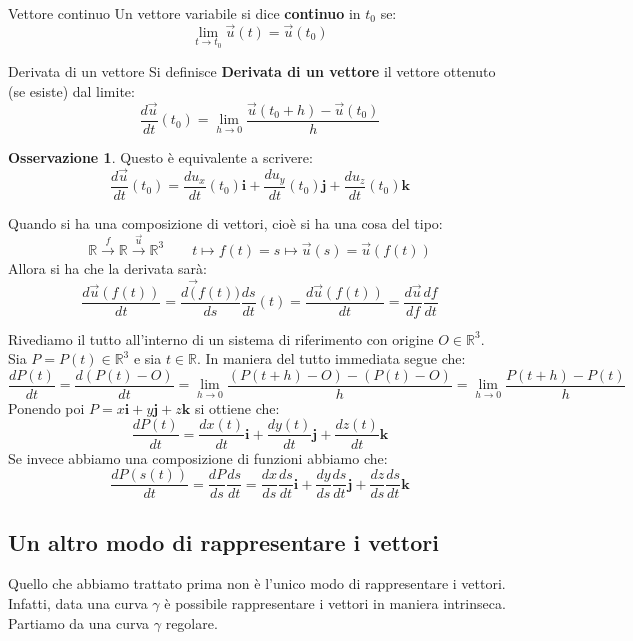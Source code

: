 \documentclass[11pt,a4paper,twoside]{article}
\theoremstyle{definition}
\newtheorem*{oss}{Osservazione}
\begin{document}
\begin{defn}{Vettore continuo}{}
	Un vettore variabile si dice \textbf{continuo} in $t_0$ se:
	\[
		\lim_{t \to t_0} \vec u(t) = \vec u(t_0)
	\]
\end{defn}

\begin{defn}{Derivata di un vettore}{}
	Si definisce \textbf{Derivata di un vettore} il vettore ottenuto (se esiste) dal limite:
	\[
		\frac{d\vec u}{dt}(t_0) = \lim_{h \to 0}\frac{\vec u(t_0 + h) - \vec u(t_0)}{h}
	\]
\end{defn}

\begin{oss}
	Questo è equivalente a scrivere:
	\[
		\frac{d\vec u}{dt}(t_0) = \frac{du_x}{dt}(t_0) \mathbf i + \frac{du_y}{dt}(t_0) \mathbf j + \frac{du_z}{dt}(t_0) \mathbf k
	\]
\end{oss}

Quando si ha una composizione di vettori, cioè si ha una cosa del tipo:
\[
	\mathbb R \xrightarrow f \mathbb R \xrightarrow {\vec u} \mathbb R^3\qquad t \mapsto f(t)=s \mapsto \vec u(s) = \vec u(f(t))
\]
Allora si ha che la derivata sarà:
\[
	\frac{d\vec u(f(t))}{dt} = \frac{d\vec (f(t))}{ds} \frac{ds}{dt}(t) = \frac{d \vec u(f(t))}{dt} = \frac{d \vec u}{df}\frac{df}{dt}
\]

Rivediamo il tutto all'interno di un sistema di riferimento con origine $O \in \mathbb R^3$.\\
Sia $P = P(t)\in \mathbb R^3$ e sia $t \in \mathbb R$. In maniera del tutto immediata segue che:
\[
	\frac{dP(t)}{dt} = \frac{d(P(t)-O)}{dt} = \lim_{h \to 0}\frac{(P(t+h)-O) - (P(t)-O)}{h} = \lim_{h \to 0}\frac{P(t+h) - P(t)}{h}
\]
Ponendo poi $P = x \mathbf i + y\mathbf j + z \mathbf k$ si ottiene che:
\[ \frac{dP(t)}{dt} = \frac{dx(t)}{dt}\mathbf i + \frac{dy(t)}{dt}\mathbf j + \frac{dz(t)}{dt}\mathbf k\]
Se invece abbiamo una composizione di funzioni abbiamo che:
\[ \frac{dP(s(t))}{dt} = \frac{dP}{ds}\frac{ds}{dt} = \frac{dx}{ds}\frac{ds}{dt}\mathbf i + \frac{dy}{ds}\frac{ds}{dt}\mathbf j + \frac{dz}{ds}\frac{ds}{dt}\mathbf k \]

\subsection{Un altro modo di rappresentare i vettori}

Quello che abbiamo trattato prima non è l'unico modo di rappresentare i vettori. Infatti, data una curva $\gamma$ è possibile rappresentare i vettori in maniera intrinseca.\\
Partiamo da una curva $\gamma$ regolare.
\end{document}
